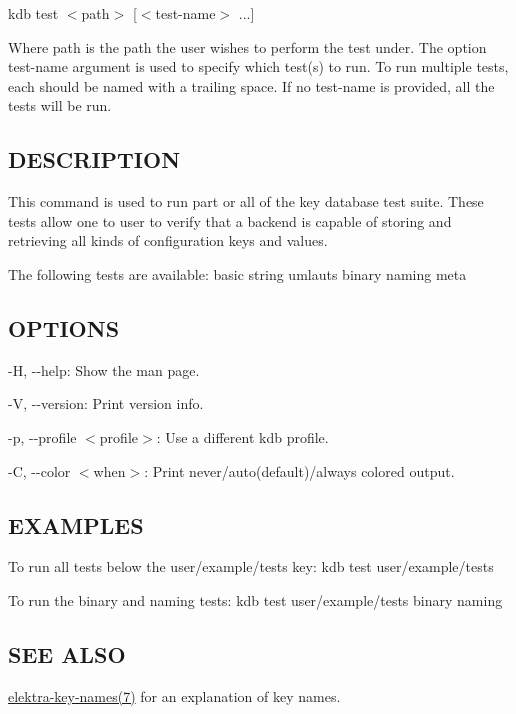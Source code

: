 {\ttfamily kdb test $<$path$>$ \mbox{[}$<$test-\/name$>$ ...\mbox{]}}

Where {\ttfamily path} is the path the user wishes to perform the test under. The option {\ttfamily test-\/name} argument is used to specify which test(s) to run. To run multiple tests, each should be named with a trailing space. If no {\ttfamily test-\/name} is provided, all the tests will be run.

\subsection*{D\+E\+S\+C\+R\+I\+P\+T\+I\+ON}

This command is used to run part or all of the key database test suite. These tests allow one to user to verify that a backend is capable of storing and retrieving all kinds of configuration keys and values.

The following tests are available\+: basic string umlauts binary naming meta

\subsection*{O\+P\+T\+I\+O\+NS}


\begin{DoxyItemize}
\item {\ttfamily -\/H}, {\ttfamily -\/-\/help}\+: Show the man page.
\item {\ttfamily -\/V}, {\ttfamily -\/-\/version}\+: Print version info.
\item {\ttfamily -\/p}, {\ttfamily -\/-\/profile $<$profile$>$}\+: Use a different kdb profile.
\item {\ttfamily -\/C}, {\ttfamily -\/-\/color $<$when$>$}\+: Print never/auto(default)/always colored output.
\end{DoxyItemize}

\subsection*{E\+X\+A\+M\+P\+L\+ES}

To run all tests below the {\ttfamily user/example/tests} key\+: {\ttfamily kdb test user/example/tests}

To run the {\ttfamily binary} and {\ttfamily naming} tests\+: {\ttfamily kdb test user/example/tests binary naming}

\subsection*{S\+EE A\+L\+SO}


\begin{DoxyItemize}
\item \hyperlink{md_doc_help_elektra-key-names_doc_help_elektra-key-names_md}{elektra-\/key-\/names(7)} for an explanation of key names. 
\end{DoxyItemize}